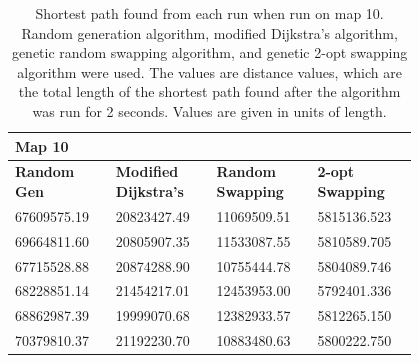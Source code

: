 \documentclass{article}
\begin{document}
\begin{appendices}
\begin{table}[H]
    \caption{Shortest path found from each run when run on map 10. Random generation algorithm, modified Dijkstra's algorithm, genetic random swapping algorithm, and genetic 2-opt swapping algorithm were used. The values are distance values, which are the total length of the shortest path found after the algorithm was run for 2 seconds. Values are given in units of length.}
    \centering
    \begin{tabular}{|p{0.2\linewidth}|p{0.2\linewidth}|p{0.2\linewidth}|p{0.2\linewidth}|}
    \hline
        \textbf{Map 10} & ~ & ~ & ~ \\ \hline
        \textbf{Random Gen} & \textbf{Modified Dijkstra's} & \textbf{Random Swapping} & \textbf{2-opt Swapping} \\ \hline
        67609575.19 & 20823427.49 & 11069509.51 & 5815136.523 \\ \hline
        69664811.60 & 20805907.35 & 11533087.55 & 5810589.705 \\ \hline
        67715528.88 & 20874288.90 & 10755444.78 & 5804089.746 \\ \hline
        68228851.14 & 21454217.01 & 12453953.00 & 5792401.336 \\ \hline
        68862987.39 & 19999070.68 & 12382933.57 & 5812265.150 \\ \hline
        70379810.37 & 21192230.70 & 10883480.63 & 5800222.750 \\ \hline
    \end{tabular}
\end{table}


\end{appendices}
\end{document}
